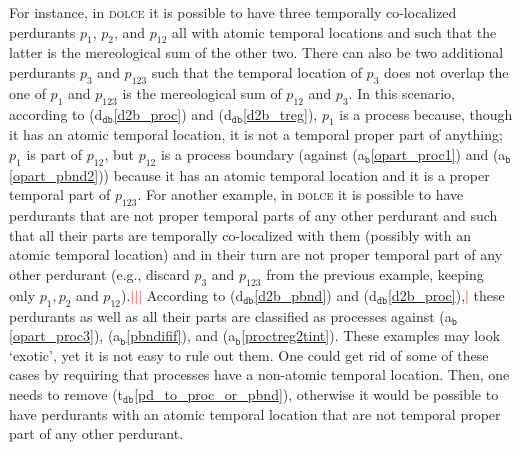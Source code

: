 \documentclass[ao]{iosart2x}
\newcommand{\nb}[1]{\textcolor{red}{$|$}\marginpar{\hspace*{-0cm}\parbox{20mm}{\scriptsize\raggedright\textcolor{red}{#1}}}}
\newcommand{\bfoAxLabel}{\textrm{a$_\texttt{b}$}}
\newcommand{\dbDefLabel}{\textrm{d$_\texttt{db}$}}
\newcommand{\dbThrLabel}{\textrm{t$_\texttt{db}$}}
\newcommand{\refbfoax}[1]{({\bfoAxLabel}\ref{#1})}
\newcommand{\refdbdf}[1]{({\dbDefLabel}\ref{#1})}
\newcommand{\refdbth}[1]{({\dbThrLabel}\ref{#1})}
\newcommand{\pr}[1]{\mathtt{#1}}
\newcommand{\dolce}{{\textsc{dolce}}}
\newcommand {\SUMd} {\ensuremath{\pr{SUM}}}
\begin{document}
For instance, in {\dolce} it is possible to have three temporally co-localized perdurants $p_1$, $p_2$, and $p_{12}$ all with atomic temporal locations and such that  the latter is the mereological sum of the other two. %
There can also be two additional perdurants $p_3$ and $p_{123}$ such that the temporal location of $p_3$ does not overlap the one of $p_1$ and $p_{123}$ is the mereological sum of $p_{12}$ and $p_{3}$. %
 In this scenario, according to \refdbdf{d2b_proc} and \refdbdf{d2b_treg}, $p_{1}$ is a process because, though it has an atomic temporal location, it is not a temporal proper part of anything; $p_1$ is part of $p_{12}$, but $p_{12}$ is a process boundary (against \refbfoax{opart_proc1} and \refbfoax{opart_pbnd2}) because it has an atomic temporal location and it is a proper temporal part of $p_{123}$. For another example, in {\dolce} it is possible to have perdurants that are not proper temporal parts of any other perdurant and such that all their parts are temporally co-localized with them (possibly with an atomic temporal location) and in their turn are not proper temporal part of any other perdurant (e.g., discard $p_3$ and $p_{123}$ from the previous example, keeping only $p_1, p_2$ and $p_{12}$).\nb{SB: a me questo esempio non è chiaro}\nb{CM: cos'è che non ti è chiaro}\nb{SB: no ricordo :)} According to \refdbdf{d2b_pbnd} and \refdbdf{d2b_proc},\nb{CM: ho messo il rif. a pbnd} these perdurants as well as all their parts are classified as processes against \refbfoax{opart_proc3}, \refbfoax{pbndifif}, and \refbfoax{proctreg2tint}. These examples may look `exotic', yet it is not easy to rule out them. One could get rid of some of these cases by requiring that processes have a non-atomic temporal location. Then, one needs to remove \refdbth{pd_to_proc_or_pbnd}, otherwise it would be possible to have perdurants with an atomic temporal location that are not temporal proper part of any other perdurant. 
\end{document}
